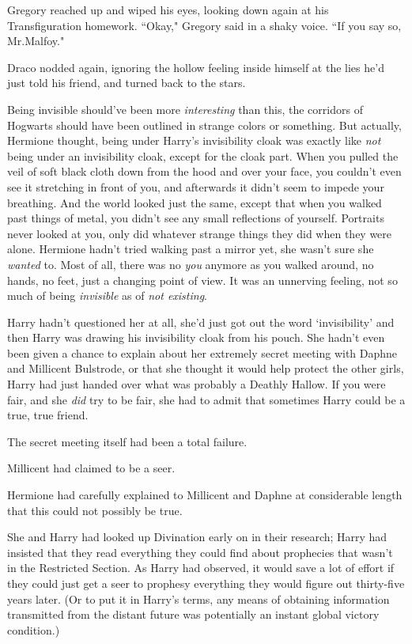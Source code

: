 Gregory reached up and wiped his eyes, looking down again at his Transfiguration homework. ``Okay," Gregory said in a shaky voice. ``If you say so, Mr.\?Malfoy."

Draco nodded again, ignoring the hollow feeling inside himself at the lies he'd just told his friend, and turned back to the stars.


Being invisible should've been more \emph{interesting} than this, the corridors of Hogwarts should have been outlined in strange colors or something. But actually, Hermione thought, being under Harry's invisibility cloak was exactly like \emph{not} being under an invisibility cloak, except for the cloak part. When you pulled the veil of soft black cloth down from the hood and over your face, you couldn't even see it stretching in front of you, and afterwards it didn't seem to impede your breathing. And the world looked just the same, except that when you walked past things of metal, you didn't see any small reflections of yourself. Portraits never looked at you, only did whatever strange things they did when they were alone. Hermione hadn't tried walking past a mirror yet, she wasn't sure she \emph{wanted} to. Most of all, there was no \emph{you} anymore as you walked around, no hands, no feet, just a changing point of view. It was an unnerving feeling, not so much of being \emph{invisible} as of \emph{not existing}.

Harry hadn't questioned her at all, she'd just got out the word `invisibility' and then Harry was drawing his invisibility cloak from his pouch. She hadn't even been given a chance to explain about her extremely secret meeting with Daphne and Millicent Bulstrode, or that she thought it would help protect the other girls, Harry had just handed over what was probably a Deathly Hallow. If you were fair, and she \emph{did} try to be fair, she had to admit that sometimes Harry could be a true, true friend.

The secret meeting itself had been a total failure.

Millicent had claimed to be a seer.

Hermione had carefully explained to Millicent and Daphne at considerable length that this could not possibly be true.

She and Harry had looked up Divination early on in their research; Harry had insisted that they read everything they could find about prophecies that wasn't in the Restricted Section. As Harry had observed, it would save a lot of effort if they could just get a seer to prophesy everything they would figure out thirty-five years later. (Or to put it in Harry's terms, any means of obtaining information transmitted from the distant future was potentially an instant global victory condition.)

